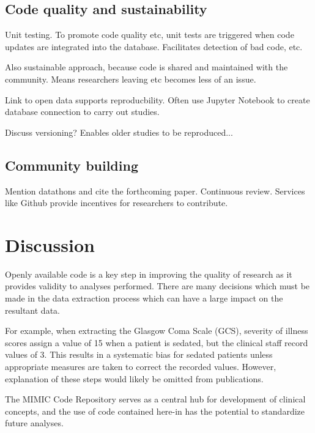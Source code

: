 \documentclass{bioinfo}
\begin{document}
\begin{methods}
\subsection{Code quality and sustainability}

Unit testing. To promote code quality etc, unit tests are triggered when code updates are integrated into the database. Facilitates detection of bad code, etc.

Also sustainable approach, because code is shared and maintained with the community. Means researchers leaving etc becomes less of an issue.

Link to open data supports reproducbility. Often use Jupyter Notebook to create database connection to carry out studies.

Discuss versioning? Enables older studies to be reproduced...

\subsection{Community building}

Mention datathons and cite the forthcoming paper.  Continuous review. Services like Github provide incentives for researchers to contribute.

\end{methods}


\section{Discussion}

Openly available code is a key step in improving the quality of research as it provides validity to analyses performed. There are many decisions which must be made in the data extraction process which can have a large impact on the resultant data. 

For example, when extracting the Glasgow Coma Scale (GCS), severity of illness scores assign a value of 15 when a patient is sedated, but the clinical staff record values of 3. This results in a systematic bias for sedated patients unless appropriate measures are taken to correct the recorded values. However, explanation of these steps would likely be omitted from publications. 

The MIMIC Code Repository serves as a central hub for development of clinical concepts, and the use of code contained here-in has the potential to standardize future analyses.
\end{document}

